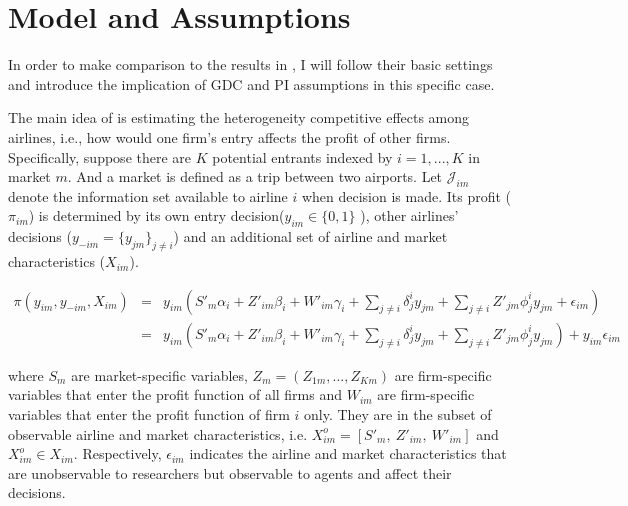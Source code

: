 \documentclass[a4paper]{article}
\begin{document}
\section{Model and Assumptions}

In order to make comparison to the results in \cite{ciliberto2009market}, I will follow their basic settings and introduce the implication of GDC and PI assumptions in this specific 
case.

The main idea of \cite{ciliberto2009market} is estimating the heterogeneity competitive effects among airlines, i.e., how would one firm's entry affects the profit of other firms. Specifically, suppose there are $K$ potential entrants indexed by $i=1,...,K$ in market $m$. And a market is defined as a trip between two airports. Let $\mathcal{J}_{im}$ denote the information set available to airline $i$ when decision is made. Its profit ($\pi_{im}$) is determined by its own entry decision($y_{im} \in \{0,1\}$ ), other airlines' decisions ($y_{-im}=\{y_{jm}\}_{j \neq i}$) and an additional set of airline and market characteristics ($X_{im}$). 



\begin{eqnarray}
\pi(y_{im},y_{-im},X_{im})&=&y_{im}(S'_m\alpha_i+Z'_{im}\beta_i+W'_{im}\gamma_i+\sum_{j\neq i}\delta_{j}^i y_{jm}+\sum_{j\neq i}Z'_{jm}\phi_j^iy_{jm}+\epsilon_{im})  \nonumber \\
&=& y_{im}(S'_m\alpha_i+Z'_{im}\beta_i+W'_{im}\gamma_i+\sum_{j\neq i}\delta_{j}^i y_{jm}+\sum_{j\neq i}Z'_{jm}\phi_j^iy_{jm})+y_{im}\epsilon_{im} 
\label{profit}
\end{eqnarray}

 where $S_m$ are market-specific variables, $Z_{m}=(Z_{1m},...,Z_{Km})$ are firm-specific variables that enter the profit function of all firms  and $W_{im}$ are firm-specific variables that enter the profit function of firm $i$ only. They are in the subset of observable airline and market characteristics, i.e.
$X^o_{im}=[S'_m, \ Z'_{im}, \ W'_{im}]$ and $X^o_{im} \in X_{im}$. Respectively, $\epsilon_{im}$ indicates the airline and market characteristics that are unobservable to researchers but observable to agents and affect their decisions. 


 
\end{document}
